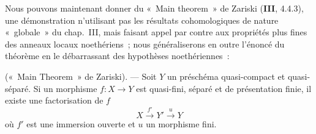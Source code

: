 \begin{env}[8.12.5]
\label{IV.8.12.5-fr}
Nous pouvons maintenant donner du «~Main theorem~» de Zariski (\textbf{III}, 4.4.3),
une démonstration n'utilisant pas les résultats cohomologiques de nature
«~globale~» du chap.~III, mais faisant appel par contre aux propriétés plus
fines des anneaux locaux noethériens~; nous généraliserons en outre l'énoncé
du théorème en le débarrassant des hypothèses noethériennes~:
\end{env}

\begin{theorem}[8.12.6]
\label{IV.8.12.6-fr}
(«~Main Theorem~» de Zariski). --- Soit $Y$ un préschéma quasi-compact et
quasi-séparé. Si un morphisme $f:X\to Y$ est quasi-fini, séparé et de
présentation finie, il existe une factorisation de $f$
\begin{equation}
\label{IV.8.12.6.1-fr}
X\xrightarrow{f'}Y'\xrightarrow{u}Y \tag{8.12.6.1}
\end{equation}
où $f'$ est une immersion ouverte et $u$ un morphisme fini.
\end{theorem}

